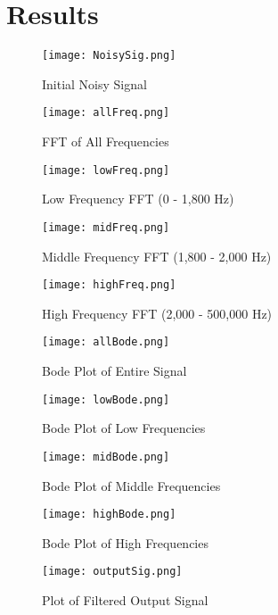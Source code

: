 \documentclass[12pt]{report}
\begin{document}
\section{Results}

\begin{figure}[htp]
    \centering
    \texttt{[image: NoisySig.png]}
    \caption{Initial Noisy Signal}
\end{figure}

\begin{figure}[htp]
    \centering
    \texttt{[image: allFreq.png]}
    \caption{FFT of All Frequencies}
\end{figure}

\begin{figure}[htp]
    \centering
    \texttt{[image: lowFreq.png]}
    \caption{Low Frequency FFT (0 - 1,800 Hz)}
\end{figure}

\begin{figure}[htp]
    \centering
    \texttt{[image: midFreq.png]}
    \caption{Middle Frequency FFT (1,800 - 2,000 Hz)}
\end{figure}

\begin{figure}[htp]
    \centering
    \texttt{[image: highFreq.png]}
    \caption{High Frequency FFT (2,000 - 500,000 Hz)}
\end{figure}

\begin{figure}[htp]
    \centering
    \texttt{[image: allBode.png]}
    \caption{Bode Plot of Entire Signal}
\end{figure}

\begin{figure}[htp]
    \centering
    \texttt{[image: lowBode.png]}
    \caption{Bode Plot of Low Frequencies}
\end{figure}

\begin{figure}[htp]
    \centering
    \texttt{[image: midBode.png]}
    \caption{Bode Plot of Middle Frequencies}
\end{figure}

\begin{figure}[htp]
    \centering
    \texttt{[image: highBode.png]}
    \caption{Bode Plot of High Frequencies}
\end{figure}

\begin{figure}[htp]
    \centering
    \texttt{[image: outputSig.png]}
    \caption{Plot of Filtered Output Signal}
\end{figure}
\end{document}
